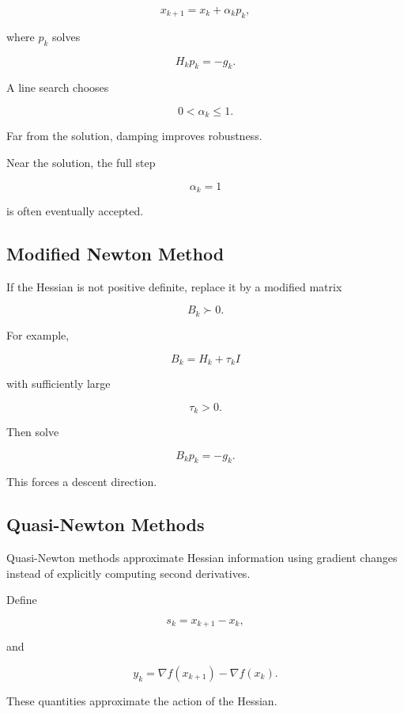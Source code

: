 \[
\boxed{
x_{k+1}
=
x_k
+
\alpha_kp_k,
}
\]

where \(p_k\) solves

\[
H_kp_k=-g_k.
\]

A line search chooses

\[
0<\alpha_k\leq1.
\]

Far from the solution, damping improves robustness.

Near the solution, the full step

\[
\alpha_k=1
\]

is often eventually accepted.

\subsection{Modified Newton Method}
\label{subsec:modified-newton}

If the Hessian is not positive definite, replace it by a modified matrix

\[
\boxed{
B_k
\succ0.
}
\]

For example,

\[
\boxed{
B_k
=
H_k+\tau_kI
}
\]

with sufficiently large

\[
\tau_k>0.
\]

Then solve

\[
\boxed{
B_kp_k=-g_k.
}
\]

This forces a descent direction.

\subsection{Quasi-Newton Methods}
\label{subsec:quasi-newton-methods}

Quasi-Newton methods approximate Hessian information using gradient
changes instead of explicitly computing second derivatives.

Define

\[
\boxed{
s_k
=
x_{k+1}-x_k,
}
\]

and

\[
\boxed{
y_k
=
\nabla f(x_{k+1})
-
\nabla f(x_k).
}
\]

These quantities approximate the action of the Hessian.

